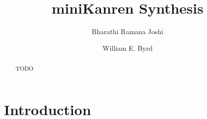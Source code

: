 \documentclass[sigplan,screen]{acmart}
\begin{document}
\title{miniKanren Synthesis}
\author{Bharathi Ramana Joshi}
\author{William E. Byrd}

\renewcommand{\shortauthors}{Joshi and Byrd}
\begin{abstract}
  TODO
\end{abstract}



\maketitle

\section{Introduction}
\label{sec:intro}





% 
% 
% 
\end{document}
